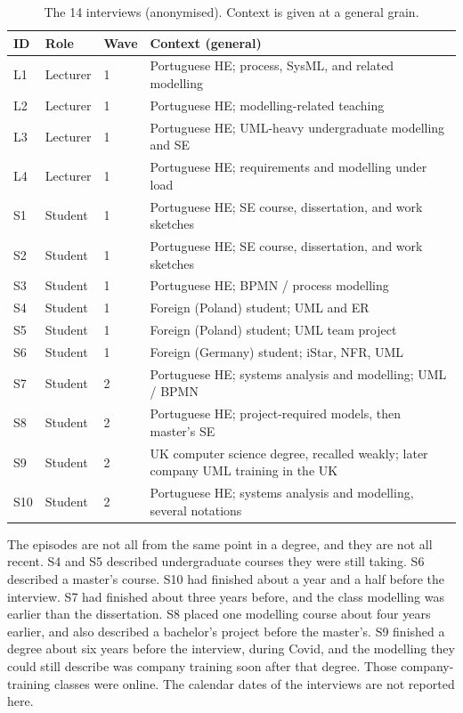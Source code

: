 \begin{table}[t]
\centering
\small
\caption{The 14 interviews (anonymised). Context is given at a general grain.}
\label{tab:participants}
\begin{tabularx}{\textwidth}{l l l X}
\toprule
\textbf{ID} & \textbf{Role} & \textbf{Wave} & \textbf{Context (general)} \\
\midrule
L1 & Lecturer & 1 & Portuguese HE; process, SysML, and related modelling \\
L2 & Lecturer & 1 & Portuguese HE; modelling-related teaching \\
L3 & Lecturer & 1 & Portuguese HE; UML-heavy undergraduate modelling and SE \\
L4 & Lecturer & 1 & Portuguese HE; requirements and modelling under load \\
S1 & Student & 1 & Portuguese HE; SE course, dissertation, and work sketches \\
S2 & Student & 1 & Portuguese HE; SE course, dissertation, and work sketches \\
S3 & Student & 1 & Portuguese HE; BPMN / process modelling \\
S4 & Student & 1 & Foreign (Poland) student; UML and ER \\
S5 & Student & 1 & Foreign (Poland) student; UML team project \\
S6 & Student & 1 & Foreign (Germany) student; iStar, NFR, UML \\
S7 & Student & 2 & Portuguese HE; systems analysis and modelling; UML / BPMN \\
S8 & Student & 2 & Portuguese HE; project-required models, then master's SE \\
S9 & Student & 2 & UK computer science degree, recalled weakly; later company UML training in the UK \\
S10 & Student & 2 & Portuguese HE; systems analysis and modelling, several notations \\
\bottomrule
\end{tabularx}
\end{table}

The episodes are not all from the same point in a degree, and they are not all recent. S4 and S5 described undergraduate courses they were still taking. S6 described a master's course. S10 had finished about a year and a half before the interview. S7 had finished about three years before, and the class modelling was earlier than the dissertation. S8 placed one modelling course about four years earlier, and also described a bachelor's project before the master's. S9 finished a degree about six years before the interview, during Covid, and the modelling they could still describe was company training soon after that degree. Those company-training classes were online. The calendar dates of the interviews are not reported here.

